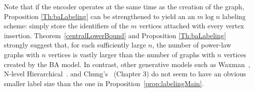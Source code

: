 Note that if the encoder operates at the same time as the creation of the graph, Proposition \ref{Th:baLabeling} can be strengthened to yield an an $m \log n$ labeling scheme: simply store the  
 identifiers of the $m$ vertices attached with every vertex insertion.
Theorem~\ref{centralLowerBound} and Proposition \ref{Th:baLabeling} strongly suggest that, for each sufficiently large $n$, the number of  power-law graphs with $n$ vertices  is vastly larger than the number of graphs with $n$ vertices created by the  BA model.  In contrast, other generative models such as   Waxman~\cite{waxman1988routing}, N-level Hierarchical~\cite{calvert1997modeling}.
and Chung's~\cite{chung2006complex} (Chapter 3)  do not seem to have an obvious smaller label size than the one in Proposition~\ref{prop:labelingMain}.

